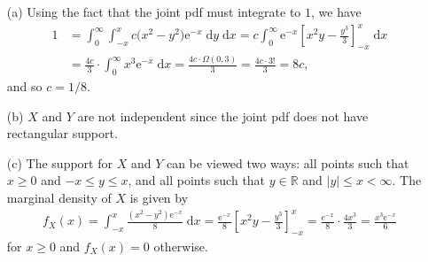 \documentclass[10pt]{article}
\begin{document}
\begin{itemize}
    \item[(a)] 
    Using the fact that the joint pdf must integrate to \(1\), we have 
    \begin{align*}
        1 &= \int_0^{\infty} \int_{-x}^{x} c \big( x^2 - y^2 \big) \mathrm{e}^{-x} \;\mathrm{d}y \;\mathrm{d}x
        = c \int_0^{\infty} \mathrm{e}^{-x} \left[ x^2y - \frac{y^3}{3} \right]_{-x}^{x} \;\mathrm{d}x \\
        &= \frac{4c}{3} \cdot \int_0^{\infty} x^3 \mathrm{e}^{-x} \;\mathrm{d}x
        = \frac{4c \cdot \Omega(0,3)}{3} 
        = \frac{4c \cdot 3!}{3}
        = 8 c,
    \end{align*}
    and so \(c = 1/8\). 
    \item[(b)] \(X\) and \(Y\) are not independent since the joint pdf does not have rectangular support. 
    \item[(c)] The support for \(X\) and \(Y\) can be viewed two ways: all points such that \(x \ge 0\) and \(-x \le y \le x\),
    and all points such that \(y \in \mathbb{R}\) and \(|y| \le x < \infty\). 
    The marginal density of \(X\) is given by 
    \begin{align*}
        f_X(x) = \int_{-x}^x \frac{(x^2 - y^2)\mathrm{e}^{-x}}{8} \;\mathrm{d}x
        = \frac{\mathrm{e}^{-x}}{8} \left[ x^2y - \frac{y^3}{3} \right]_{-x}^x
        = \frac{e^{-x}}{8} \cdot \frac{4 x^3}{3}
        = \frac{x^3 \mathrm{e}^{-x}}{6}
    \end{align*}
    for \(x \ge 0\) and \(f_X(x) = 0\) otherwise.

\end{itemize}
\end{document}
